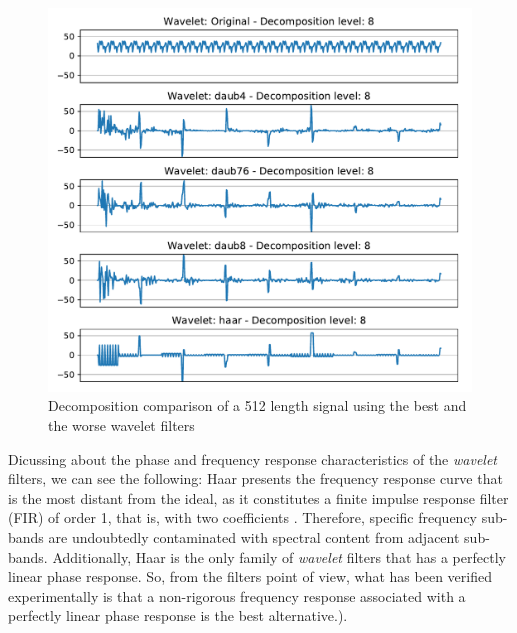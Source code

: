 		\begin{figure}[H]
			\centering
			\includegraphics[scale=.55]{images/results/haarDaubComparison/haarDaub42Comparison}
			\caption{Decomposition comparison of a 512 length signal using the best and the worse wavelet filters}
			\label{fig:haardaub42comparison}
		\end{figure}

		\par Dicussing about the phase and frequency response characteristics of the \textit{wavelet} filters, we can see the following: Haar presents the frequency response curve that is the most distant from the ideal, as it constitutes a finite impulse response filter (FIR) of order 1, that is, with two coefficients \cite{WaveletPropertiesBrowser}. Therefore, specific frequency sub-bands are undoubtedly contaminated with spectral content from adjacent sub-bands. Additionally, Haar is the only family of \textit{wavelet} filters that has a perfectly linear phase response. So, from the filters point of view, what has been verified experimentally is that a non-rigorous frequency response associated with a perfectly linear phase response is the best alternative.). 

		

